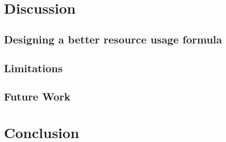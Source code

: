 \section{Discussion}

\subsection{Designing a better resource usage formula}

\subsection{Limitations}

\subsection{Future Work}

\section{Conclusion}